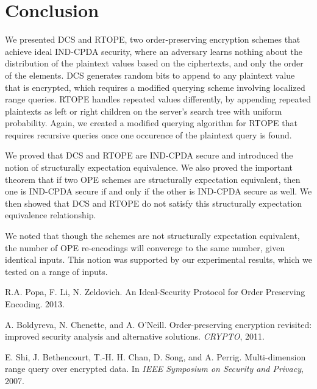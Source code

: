 \documentclass[12pt]{article}
\begin{document}
\section{Conclusion}

 We presented DCS and RTOPE, two order-preserving encryption schemes that achieve ideal IND-CPDA security, where an adversary learns nothing about the distribution of the plaintext values based on the ciphertexts, and only the order of the elements. DCS generates random bits to append to any plaintext value that is encrypted, which requires a modified querying scheme involving localized range queries. RTOPE handles repeated values differently, by appending repeated plaintexts as left or right children on the server's search tree with uniform probability. Again, we created a modified querying algorithm for RTOPE that requires recursive queries once one occurence of the plaintext query is found. 

We proved that DCS and RTOPE are IND-CPDA secure and introduced the notion of structurally expectation equivalence. We also proved the important theorem that if two OPE schemes are structurally expectation equivalent, then one is IND-CPDA secure if and only if the other is IND-CPDA secure as well. We then showed that DCS and RTOPE do not satisfy this structurally expectation equivalence relationship.

We noted that though the schemes are not structurally expectation equivalent, the number of OPE re-encodings will converege to the same number, given identical inputs. This notion was supported by our experimental results, which we tested on a range of inputs.

\begin{thebibliography}{9}

  R.A. Popa, F. Li, N. Zeldovich.
  An Ideal-Security Protocol for Order Preserving Encoding.
  2013.

  A. Boldyreva, N. Chenette, and A. O’Neill. 
  Order-preserving encryption revisited: improved security analysis and alternative
  solutions. \emph{CRYPTO}, 2011.
  
  E. Shi, J. Bethencourt, T.-H. H. Chan, D. Song, and A. Perrig.
Multi-dimension range query over encrypted data. In \emph{IEEE
Symposium on Security and Privacy}, 2007.

\end{thebibliography}
  
\end{document}
